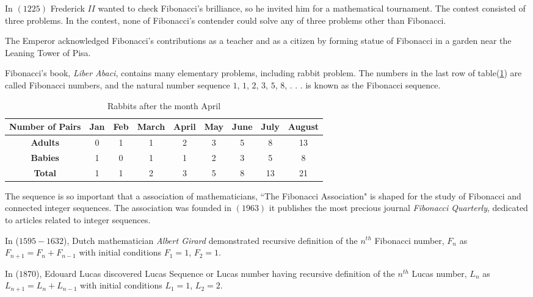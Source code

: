 \begin{large}
\noindent In $(1225)$ Frederick $II$ wanted to check Fibonacci's brilliance, so he invited him  for a mathematical tournament. The contest consisted of three problems.  In the contest, none of Fibonacci's contender could solve any of three problems other than Fibonacci. 

\noindent The Emperor acknowledged Fibonacci's contributions as a teacher and as a citizen by forming statue of Fibonacci in a garden near the Leaning Tower of Pisa.

\noindent Fibonacci's  book,\textit{ Liber Abaci}, contains many elementary problems, including rabbit problem.
\noindent The numbers in the last row of table(\ref{Tab1}) are called Fibonacci numbers, and the natural number sequence $1$, $1$, $2$, $3$, $5$, $8$, . . . is known as the Fibonacci sequence. 
\begin{table}[H]
\begin{center}
\small
\begin{tabular}{|ccccccccc|}      
\hline 
\rule[-1ex]{0pt}{2.5ex} \textbf{Number of Pairs} & \textbf{Jan} & \textbf{Feb} & \textbf{March} & \textbf{April} & \textbf{May} & \textbf{June} & \textbf{July }& \textbf{August }\\ 
\hline 
\rule[-1ex]{0pt}{2.5ex} \textbf{Adults} & 0 & 1 & 1 & 2 & 3 & 5 & 8 & 13 \\ 
\hline 
\rule[-1ex]{0pt}{2.5ex} \textbf{Babies}  & 1 & 0 & 1 & 1 & 2 & 3 & 5 & 8 \\ 
\hline 
\rule[-1ex]{0pt}{2.5ex} \textbf{Total} & 1 & 1 & 2 & 3 & 5 & 8 & 13 & 21 \\ 
\hline 
\end{tabular} 
\caption{{Rabbits after the month April}}
\label{Tab1} 
\end{center}
\end{table}

\noindent The sequence is so important  that a association of mathematicians, ``The Fibonacci Association" is shaped for the study of Fibonacci and connected integer sequences. The association was founded in $(1963)$ it publishes the most precious journal  \textit{Fibonacci Quarterly}, dedicated to articles related to integer sequences. 

\noindent In ($1595-1632$), Dutch mathematician \textit{Albert Girard}  demonstrated recursive definition of the $n^{th}$ Fibonacci number, $F_n$ as  $F_{n+1} = F_{n}+F_{n-1}$ with initial conditions $F_1 =1$, $F_2 = 1$. 

\noindent In ($1870$),  Edouard Lucas discovered Lucas Sequence or Lucas number having recursive definition of the $n^{th}$ Lucas number, $L_n$ as  $L_{n+1} = L_{n}+L_{n-1}$ with initial conditions $L_1 =1$, $L_2 = 2$.

\end{large}
